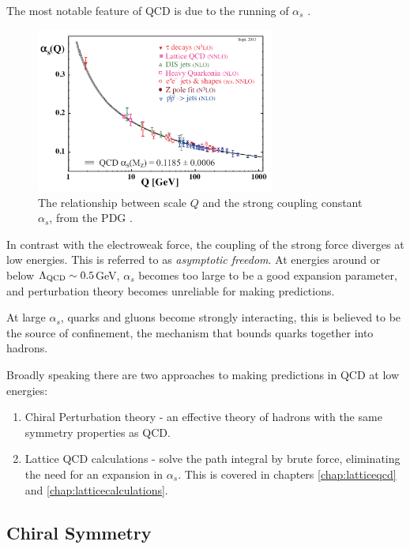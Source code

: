 The most notable feature of QCD is due to the running of $\alpha_s$ \cite{PhysRevLett.30.1343}.
\begin{figure}
  \begin{center}
    \includegraphics[width=0.7\textwidth]{images/QCD-running-coupling.png}
  \end{center}
  \caption{The relationship between scale $Q$ and the strong coupling constant $\alpha_s$, from the PDG \cite{PhysRevD.98.030001}.}
  \label{fig:alpha_s}
\end{figure}
In contrast with the electroweak force, the coupling of the strong force diverges at low energies. This is referred to as {\it{asymptotic freedom}}. At energies around or below $\Lambda_{\text{QCD}} \sim 0.5$GeV, $\alpha_s$ becomes too large to be a good expansion parameter, and perturbation theory becomes unreliable for making predictions.

At large $\alpha_s$, quarks and gluons become strongly interacting, this is believed to be the source of confinement, the mechanism that bounds quarks together into hadrons. %

Broadly speaking there are two approaches to making predictions in QCD at low energies:
\begin{enumerate}
\item
  Chiral Perturbation theory - an effective theory of hadrons with the same symmetry properties as QCD.
\item
  Lattice QCD calculations - solve the path integral by brute force, eliminating the need for an expansion in $\alpha_s$. This is covered in chapters \ref{chap:latticeqcd} and \ref{chap:latticecalculations}.
\end{enumerate}

\subsection{Chiral Symmetry}
\label{sec:chiralsymmetry}

